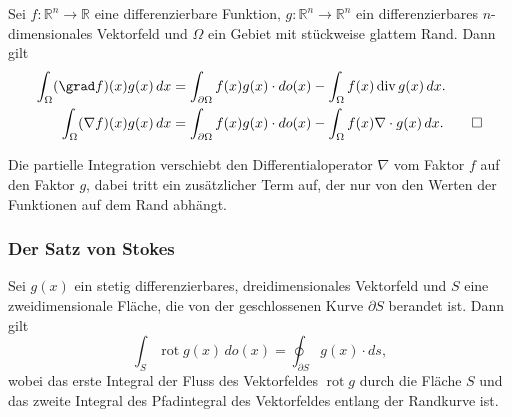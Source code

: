\begin{satz}
Sei $f\colon\mathbb{R}^n\to\mathbb{R}$ eine differenzierbare Funktion,
$g\colon\mathbb{R}^n\to\mathbb{R}^n$ ein differenzierbares
$n$-dimensionales Vektorfeld und $\Omega$ ein Gebiet mit stückweise
glattem Rand.
Dann gilt
\begin{align*}
\int_{\Omega} (\grad f)(x) g(x)\,dx
&=
\int_{\partial\Omega} f(x)g(x)\cdot do(x)
-
\int_{\Omega} f(x)\operatorname{div}g(x)\,dx.
\\
\int_{\Omega} (\nabla f)(x)g(x)\,dx
&=
\int_{\partial\Omega} f(x)g(x)\cdot do(x)
-
\int_{\Omega} f(x)\nabla\cdot g(x)\,dx.
\qedhere
\end{align*}
\end{satz}

Die partielle Integration verschiebt den Differentialoperator $\nabla$
vom Faktor $f$ auf den Faktor $g$, dabei tritt ein zusätzlicher Term
auf, der nur von den Werten der Funktionen auf dem Rand abhängt.


%
%
\subsubsection{Der Satz von Stokes}

\begin{satz}[Stokes]
\label{buch:felder:fundamentallemma:satz:stokes}
%
%
Sei $g(x)$ ein stetig differenzierbares, dreidimensionales Vektorfeld
und $S$ eine zweidimensionale Fläche, die von der geschlossenen
Kurve $\partial S$ berandet ist.
Dann gilt
\[
\int_S \operatorname{rot} g(x)\,do(x)
=
\oint_{\partial S} g(x)\cdot ds,
\]
wobei das erste Integral der Fluss des Vektorfeldes $\operatorname{rot}g$
durch die Fläche $S$ und das zweite Integral des Pfadintegral des
Vektorfeldes entlang der Randkurve ist.
\end{satz}

%
%
